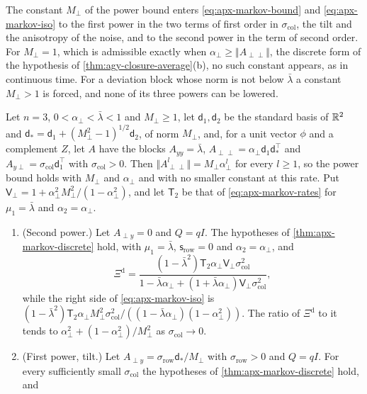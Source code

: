 The constant $M_\perp$ of the power bound enters \eqref{eq:apx-markov-bound} and \eqref{eq:apx-markov-iso} to the first power in the two terms of first order in $\sigma_{\mathrm{col}}$, the tilt and the anisotropy of the noise, and to the second power in the term of second order. For $M_\perp=1$, which is admissible exactly when $\alpha_\perp\ge\Vert A_{\perp\perp}\Vert$, the discrete form of the hypothesis of \cref{thm:agy-closure-average}(b), no such constant appears, as in continuous time. For a deviation block whose norm is not below $\bar\lambda$ a constant $M_\perp>1$ is forced, and none of its three powers can be lowered.

\begin{proposition}\label{prop:apx-markov-nonnormal}
Let $n=3$, $0<\alpha_\perp<\bar\lambda<1$ and $M_\perp\ge1$, let $\mathsf d_1,\mathsf d_2$ be the standard basis of $\mathbb{R}^2$ and $\mathsf d_\ast=\mathsf d_1+(M_\perp^2-1)^{1/2}\mathsf d_2$, of norm $M_\perp$, and, for a unit vector $\phi$ and a complement $Z$, let $A$ have the blocks $A_{yy}=\bar\lambda$, $A_{\perp\perp}=\alpha_\perp\mathsf d_1\mathsf d_\ast^\top$ and $A_{y\perp}=\sigma_{\mathrm{col}}\mathsf d_1^\top$ with $\sigma_{\mathrm{col}}>0$. Then $\Vert A_{\perp\perp}^l\Vert=M_\perp\alpha_\perp^l$ for every $l\ge1$, so the power bound holds with $M_\perp$ and $\alpha_\perp$ and with no smaller constant at this rate. Put $\mathsf V_\perp=1+\alpha_\perp^2M_\perp^2/(1-\alpha_\perp^2)$, and let $\mathsf T_2$ be that of \eqref{eq:apx-markov-rates} for $\mu_1=\bar\lambda$ and $\alpha_2=\alpha_\perp$.
\begin{enumerate}
\item[(i)] (Second power.) Let $A_{\perp y}=0$ and $Q=qI$. The hypotheses of \cref{thm:apx-markov-discrete} hold, with $\mu_1=\bar\lambda$, $\mathsf s_{\mathrm{row}}=0$ and $\alpha_2=\alpha_\perp$, and
\begin{equation}\label{eq:apx-markov-nonnormal}
\Xi^{\mathrm d}=\frac{(1-\bar\lambda^2)\mathsf T_2\alpha_\perp\mathsf V_\perp\sigma_{\mathrm{col}}^2}{1-\bar\lambda\alpha_\perp+(1+\bar\lambda\alpha_\perp)\mathsf V_\perp\sigma_{\mathrm{col}}^2},
\end{equation}
while the right side of \eqref{eq:apx-markov-iso} is $(1-\bar\lambda^2)\mathsf T_2\alpha_\perp M_\perp^2\sigma_{\mathrm{col}}^2/((1-\bar\lambda\alpha_\perp)(1-\alpha_\perp^2))$. The ratio of $\Xi^{\mathrm d}$ to it tends to $\alpha_\perp^2+(1-\alpha_\perp^2)/M_\perp^2$ as $\sigma_{\mathrm{col}}\to0$.
\item[(ii)] (First power, tilt.) Let $A_{\perp y}=\sigma_{\mathrm{row}}\mathsf d_\ast/M_\perp$ with $\sigma_{\mathrm{row}}>0$ and $Q=qI$. For every sufficiently small $\sigma_{\mathrm{col}}$ the hypotheses of \cref{thm:apx-markov-discrete} hold, and

\end{enumerate}
\end{proposition}
